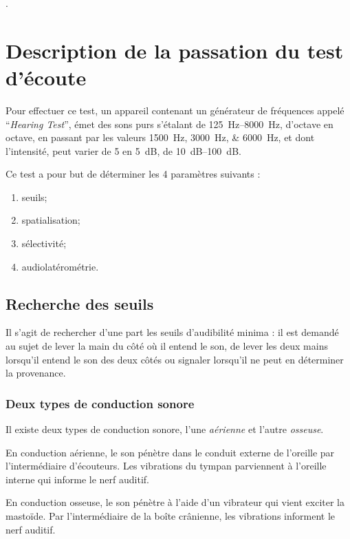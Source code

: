 \autocite{lemonde.fr:stradivarius}.

\autocite[p. 43]{roque:lecoute}

\section{Description de la passation du test d'écoute}
\label{passation}

Pour effectuer ce test, un appareil contenant un générateur de fréquences appelé ``\emph{Hearing Test}'', émet des sons purs s'étalant de \SIrange{125}{8000}{\Hz}, d'octave en octave, en passant par les valeurs
\SIlist{1500;3000;6000}{\Hz}, et dont l'intensité, peut varier de 5 en \SI{5}{\dB}, de \SIrange{10}{100}{\dB}. 

Ce test a pour but de déterminer les 4 paramètres suivants : 
\begin{enumerate}
\item seuils;
\item spatialisation;
\item sélectivité;
\item audiolatérométrie.
\end{enumerate}

\subsection{Recherche des seuils}

Il s'agit de rechercher d'une part les seuils d'audibilité
minima : il est demandé au sujet de lever la main du côté
où il entend le son, de lever les deux mains lorsqu'il entend le son
des deux côtés ou signaler lorsqu'il ne peut en déterminer la provenance.

\subsubsection{Deux types de conduction sonore}
Il existe deux types de conduction sonore, l'une \emph{aérienne} et l'autre \emph{osseuse}.

En conduction aérienne, le son pénètre dans le conduit externe de
l'oreille par l'intermédiaire d'écouteurs. Les vibrations du tympan
parviennent à l'oreille interne qui informe le nerf auditif.

En conduction osseuse, le son pénètre à l'aide d'un
vibrateur qui vient exciter la mastoïde. Par l'intermédiaire de la
boîte crânienne, les vibrations informent le nerf auditif.

